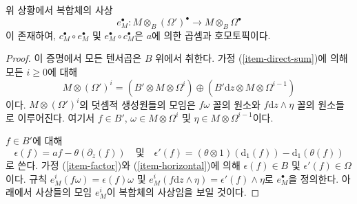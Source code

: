 \begin{lemma}
\label{lemma-find-homotopy}
위 상황에서 복합체의 사상
$$
e_M^\bullet :
M \otimes_B (\Omega')^\bullet
\longrightarrow
M \otimes_B \Omega^\bullet
$$
이 존재하여, $c_M^\bullet \circ e_M^\bullet$ 및
$e_M^\bullet \circ c_M^\bullet$은 $a$에 의한 곱셈과 호모토픽이다.
\end{lemma}

\begin{proof}
이 증명에서 모든 텐서곱은 $B$ 위에서 취한다. 가정
(\ref{item-direct-sum})에 의해 모든 $i \geq 0$에 대해
$$
M \otimes (\Omega')^i =
(B' \otimes M \otimes \Omega^i)
\oplus
(B' \text{d}z \otimes M \otimes \Omega^{i - 1})
$$
이다. $M \otimes (\Omega')^i$의 덧셈적 생성원들의 모임은
$f \omega$ 꼴의 원소와 $f \text{d}z \wedge \eta$ 꼴의 원소들로
이루어진다. 여기서 $f \in B'$, $\omega \in M \otimes \Omega^i$ 및
$\eta \in M \otimes \Omega^{i - 1}$이다.

\medskip\noindent
$f \in B'$에 대해
$$
\epsilon(f) = af - \theta(\partial_z(f))
\quad\text{및}\quad
\epsilon'(f) = (\theta \otimes 1)(\text{d}_1(f)) - \text{d}_1(\theta(f))
$$
로 쓴다. 가정 (\ref{item-factor})와 (\ref{item-horizontal})에 의해
$\epsilon(f) \in B$ 및 $\epsilon'(f) \in \Omega$이다. 규칙
$e^i_M(f\omega) = \epsilon(f) \omega$ 및
$e^i_M(f \text{d}z \wedge \eta) = \epsilon'(f) \wedge \eta$로
$e_M^\bullet$을 정의한다. 아래에서 사상들의 모임 $e^i_M$이 복합체의
사상임을 보일 것이다.


\end{proof}
